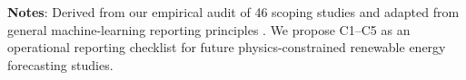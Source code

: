 \begin{table}[!t]
\begin{threeparttable}
\begin{tabularx}{\textwidth}{p{1.4cm}p{2.6cm}>{\raggedright\arraybackslash}X>{\raggedright\arraybackslash}Xp{3.2cm}}
\bottomrule
\end{tabularx}
\begin{tablenotes}[flushleft]
\footnotesize
\item \textbf{Notes}: Derived from our empirical audit of 46 scoping studies and adapted from general machine-learning reporting principles \cite{kapoor2024reforms,walsh2021dome}. We propose C1--C5 as an operational reporting checklist for future physics-constrained renewable energy forecasting studies.
\end{tablenotes}
\end{threeparttable}
\end{table}
